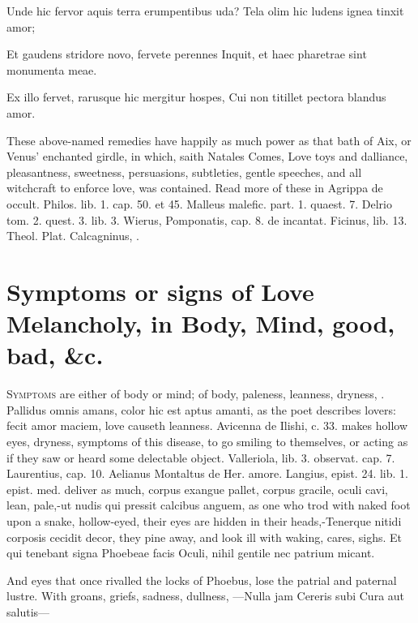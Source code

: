 Unde hic fervor aquis terra erumpentibus uda?
Tela olim hic ludens ignea tinxit amor;

Et gaudens stridore novo, fervete perennes
Inquit, et haec pharetrae sint monumenta meae.

Ex illo fervet, rarusque hic mergitur hospes,
Cui non titillet pectora blandus amor.

These above-named remedies have happily as much power as that bath of
Aix, or Venus' enchanted girdle, in which, saith Natales Comes, Love
toys and dalliance, pleasantness, sweetness, persuasions, subtleties,
gentle speeches, and all witchcraft to enforce love, was contained.
Read more of these in Agrippa de occult. Philos. lib. 1. cap. 50. et
45. Malleus malefic. part. 1. quaest. 7. Delrio tom. 2. quest. 3. lib.
3. Wierus, Pomponatis, cap. 8. de incantat. Ficinus, lib. 13. Theol.
Plat. Calcagninus, \etc{}.


\section[Symptoms or signs of Love Melancholy]{Symptoms or signs of Love Melancholy, in Body, Mind, good, bad, \&c.}

\lettrine{S}{ymptoms} are either of body or mind; of body, paleness, leanness,
dryness, \etc{}. Pallidus omnis amans, color hic est aptus amanti, as
the poet describes lovers: fecit amor maciem, love causeth leanness.
 Avicenna de Ilishi, c. 33. makes hollow eyes, dryness, symptoms
of this disease, to go smiling to themselves, or acting as if they saw
or heard some delectable object. Valleriola, lib. 3. observat. cap. 7.
Laurentius, cap. 10. Aelianus Montaltus de Her. amore. Langius, epist.
24. lib. 1. epist. med. deliver as much, corpus exangue pallet, corpus
gracile, oculi cavi, lean, pale,-ut nudis qui pressit calcibus anguem,
as one who trod with naked foot upon a snake, hollow-eyed, their eyes
are hidden in their heads,-Tenerque nitidi corposis cecidit
decor, they pine away, and look ill with waking, cares, sighs.
Et qui tenebant signa Phoebeae facis
Oculi, nihil gentile nec patrium micant.

And eyes that once rivalled the locks of Phoebus, lose the patrial and
paternal lustre. With groans, griefs, sadness, dullness,
---Nulla jam Cereris subi
Cura aut salutis---

